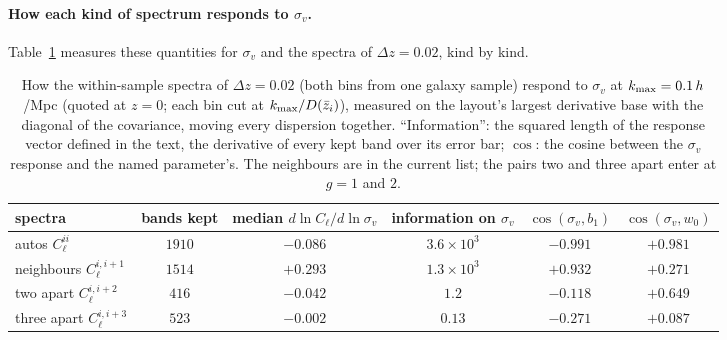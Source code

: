 \documentclass[11pt]{article}
\newcommand{\sv}{\sigma_v}
\begin{document}
\paragraph{How each kind of spectrum responds to $\sv$.}
Table~\ref{tab:svresponse} measures these quantities for $\sv$ and
the spectra of $\Delta z = 0.02$, kind by kind.

\begin{table}[ht]
  \centering
  \small
  \setlength{\tabcolsep}{4.5pt}
  \begin{tabular}{lccccc}
    \hline
    spectra & bands kept & median $d\ln C_\ell/d\ln \sv$
      & information on $\sv$ & $\cos(\sv, b_1)$ & $\cos(\sv, w_0)$ \\
    \hline
    autos $C^{ii}_\ell$ & $1910$ & $-0.086$ & $3.6 \times 10^3$
      & $-0.991$ & $+0.981$ \\
    neighbours $C^{i,i+1}_\ell$ & $1514$ & $+0.293$ & $1.3 \times 10^3$
      & $+0.932$ & $+0.271$ \\
    two apart $C^{i,i+2}_\ell$ & $416$ & $-0.042$ & $1.2$
      & $-0.118$ & $+0.649$ \\
    three apart $C^{i,i+3}_\ell$ & $523$ & $-0.002$ & $0.13$
      & $-0.271$ & $+0.087$ \\
    \hline
  \end{tabular}
  \caption{How the within-sample spectra of $\Delta z = 0.02$ (both
    bins from one galaxy sample) respond to $\sv$ at
    $k_{\rm max} = 0.1\,h$/Mpc (quoted at $z = 0$; each bin cut at
    $k_{\rm max}/D(\bar{z}_i)$), measured on the layout's largest
    derivative base with the diagonal of the covariance, moving every
    dispersion together.  ``Information'': the squared length of the
    response vector defined in the text, the derivative of every kept
    band over its error bar; $\cos$: the cosine between the $\sv$
    response and the named parameter's.  The neighbours are in the
    current list; the pairs two and three apart enter at $g = 1$
    and $2$.}
  \label{tab:svresponse}
\end{table}
\end{document}
